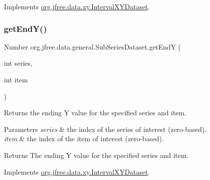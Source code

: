 Implements \mbox{\hyperlink{interfaceorg_1_1jfree_1_1data_1_1xy_1_1_interval_x_y_dataset_a93161a6d6c1db37cfac030239c62ab0a}{org.\+jfree.\+data.\+xy.\+Interval\+X\+Y\+Dataset}}.

\mbox{\label{classorg_1_1jfree_1_1data_1_1general_1_1_sub_series_dataset_a616e968d5eacad03afd3871044c5022e}} 
\subsubsection{\texorpdfstring{get\+End\+Y()}{getEndY()}}
{\footnotesize\ttfamily Number org.\+jfree.\+data.\+general.\+Sub\+Series\+Dataset.\+get\+EndY (\begin{DoxyParamCaption}\item[{int}]{series,  }\item[{int}]{item }\end{DoxyParamCaption})}

Returns the ending Y value for the specified series and item.


\begin{DoxyParams}{Parameters}
{\em series} & the index of the series of interest (zero-\/based). \\
\hline
{\em item} & the index of the item of interest (zero-\/based).\\
\hline
\end{DoxyParams}
\begin{DoxyReturn}{Returns}
The ending Y value for the specified series and item. 
\end{DoxyReturn}


Implements \mbox{\hyperlink{interfaceorg_1_1jfree_1_1data_1_1xy_1_1_interval_x_y_dataset_ae938af574bad07e7f47a8b423223ef9b}{org.\+jfree.\+data.\+xy.\+Interval\+X\+Y\+Dataset}}.

\mbox{\label{classorg_1_1jfree_1_1data_1_1general_1_1_sub_series_dataset_a2aa5a696278793154f451fddbb698e1e}} 
